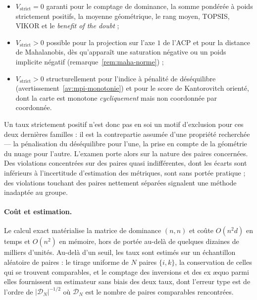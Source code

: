 \documentclass[11pt,a4paper]{article}
\theoremstyle{definition}
\theoremstyle{remark}
\newcommand{\abs}[1]{\left\lvert #1 \right\rvert}
\begin{document}
\begin{itemize}[nosep,leftmargin=1.4em]
  \item $V_{\mathrm{strict}} = 0$ garanti pour le comptage de dominance, la somme pondérée
  à poids strictement positifs, la moyenne géométrique, le rang moyen, TOPSIS, VIKOR et le
  \emph{benefit of the doubt} ;
  \item $V_{\mathrm{strict}} > 0$ possible pour la projection sur l'axe $1$ de l'ACP et
  pour la distance de Mahalanobis, dès qu'apparaît une saturation négative ou un poids
  implicite négatif (remarque~\ref{rem:maha-norme}) ;
  \item $V_{\mathrm{strict}} > 0$ structurellement pour l'indice à pénalité de
  déséquilibre (avertissement~\ref{av:mpi-monotonie}) et pour le score de Kantorovitch
  orienté, dont la carte est monotone \emph{cycliquement} mais non coordonnée par
  coordonnée.
\end{itemize}

\bigskip

Un taux strictement positif n'est donc pas en soi un motif d'exclusion pour ces deux
dernières familles : il est la contrepartie assumée d'une propriété recherchée --- la
pénalisation du déséquilibre pour l'une, la prise en compte de la géométrie du nuage pour
l'autre. L'examen porte alors sur la nature des paires concernées. Des violations
concentrées sur des paires quasi indifférentes, dont les écarts sont inférieurs à
l'incertitude d'estimation des métriques, sont sans portée pratique ; des violations
touchant des paires nettement séparées signalent une méthode inadaptée au groupe.

\bigskip

\paragraph{Coût et estimation.} Le calcul exact matérialise la matrice de dominance
$(n,n)$ et coûte $O(n^2 d)$ en temps et $O(n^2)$ en mémoire, hors de portée au-delà de
quelques dizaines de milliers d'unités. Au-delà d'un seuil, les taux sont estimés sur un
échantillon aléatoire de paires : le tirage uniforme de $N$ paires $\{i,k\}$, la
conservation de celles qui se trouvent comparables, et le comptage des inversions et des
ex \ae quo parmi elles fournissent un estimateur sans biais des deux taux, dont l'erreur
type est de l'ordre de $\abs{\mathcal{D}_N}^{-1/2}$ où $\mathcal{D}_N$ est le nombre de
paires comparables rencontrées.

\bigskip
\end{document}
